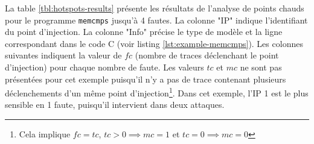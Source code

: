                La table \ref{tbl:hotspots-results} présente les résultats de l'analyse de points chauds pour le programme \texttt{memcmps} jusqu'à 4 fautes.
                La colonne "IP" indique l'identifiant du point d'injection. 
                La colonne "Info" précise le type de modèle et la ligne correspondant dans le code C (voir listing \ref{lst:example-memcmps}). Les colonnes suivantes indiquent la valeur de $fc$ (nombre de traces déclenchant le point d'injection) pour chaque nombre de faute.
                Les valeurs $tc$ et $mc$ ne sont pas présentées pour cet exemple puisqu'il n'y a pas de trace contenant plusieurs déclenchements d'un même point d'injection\footnote{Cela implique $fc = tc$, $tc > 0 \implies mc = 1$ et $tc = 0 \implies mc = 0$}.
                Dans cet exemple, l'IP 1 est le plus sensible en 1 faute, puisqu'il intervient dans deux attaques.
               
